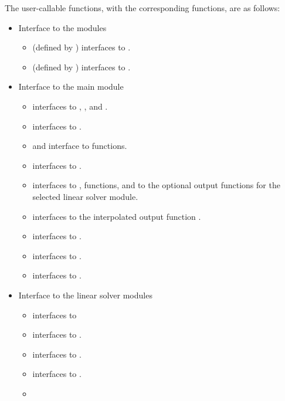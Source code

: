 The user-callable functions, with the corresponding {\cvode} functions,
are as follows:
\begin{itemize}
\item
  Interface to the {\nvector} modules
  \begin{itemize}
  \item {} (defined by {\nvecs}) 
    interfaces to .
  \item {} (defined by {\nvecp}) 
    interfaces to .
  \end{itemize}
\item Interface to the main {\cvode} module
  \begin{itemize}
  \item {}
    interfaces to , , and .
  \item {}  
    interfaces to .
  \item {} and 
    interface to  functions.
  \item {}    
    interfaces to .
  \item {}
    interfaces to ,  functions, and to the optional
    output functions for the selected linear solver module.
  \item {}     
    interfaces to the interpolated output function .
  \item {}
    interfaces to .
  \item {}
    interfaces to .
  \item {}    
    interfaces to .
  \end{itemize}  
\item Interface to the linear solver modules
  \begin{itemize}
  \item {}    
    interfaces to 
  \item {}
    interfaces to .
  \item {}
    interfaces to .
  \item {}
    interfaces to .
  \item {}

\end{itemize}
\end{itemize}
